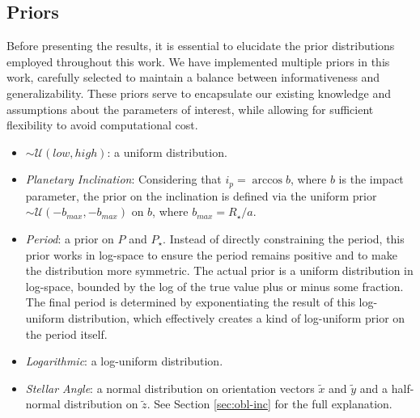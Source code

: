 \documentclass[twocolumn]{aastex631}
\begin{document}
\subsection{Priors}
Before presenting the results, it is essential to elucidate the prior distributions employed throughout this work. 
We have implemented multiple priors in this work, carefully selected to maintain a balance between informativeness and generalizability. 
These priors serve to encapsulate our existing knowledge and assumptions about the parameters of interest, while allowing for sufficient flexibility 
to avoid computational cost.
\begin{itemize}
    \item $\sim\mathcal{U}(low, high)$: a uniform distribution.
    \item \textit{Planetary Inclination}: Considering that $i_p=\arccos{b}$, where $b$ is the impact parameter,
    the prior on the inclination is defined via the uniform prior $\sim\mathcal{U}(-b_{max}, -b_{max})$ on $b$, where $b_{max} = R_{\star} / a$.
    \item \textit{Period}: a prior on $P$ and $P_{\star}$. Instead of directly constraining the period, this prior works in log-space to ensure the period 
    remains positive and to make the distribution more symmetric. The actual prior is a uniform distribution in log-space, bounded by the log of the true 
    value plus or minus some fraction. The final period is determined by exponentiating the result of this log-uniform distribution, 
    which effectively creates a kind of log-uniform prior on the period itself.
    \item \textit{Logarithmic}: a log-uniform distribution.
    \item \textit{Stellar Angle}: a normal distribution on orientation vectors $\tilde{x}$ and $\tilde{y}$ and a half-normal distribution on $\tilde{z}$. See Section
    \ref{sec:obl-inc} for the full explanation.
\end{itemize}
\end{document}
